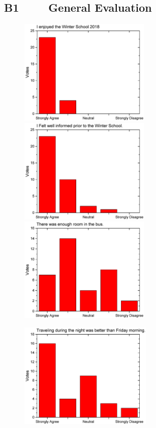 \subsection*{B1 $\qquad$ General Evaluation}
\begin{figure}[h!]
  \centering
  \begin{minipage}{.48\linewidth}
    \centering
      {\includegraphics[height=50mm]{figures/n/Graph1.pdf}}
      {\includegraphics[height=50mm]{figures/n/Graph2.pdf}}
      {\includegraphics[height=50mm]{figures/n/Graph3.pdf}}
  \end{minipage}\quad
  \begin{minipage}{.48\linewidth}
    \centering
      {\includegraphics[height=50mm]{figures/n/Graph4.pdf}}

\end{minipage}
\end{figure}
